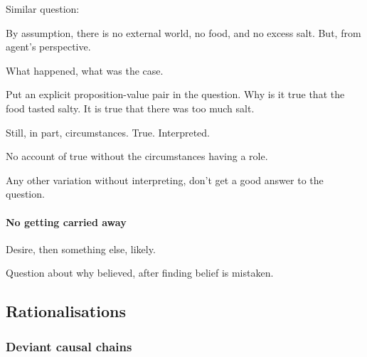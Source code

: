 \nocite{Smith:1988aa,Smith:1987tz}

\begin{note}
  Similar question:

  By assumption, there is no external world, no food, and no excess salt.
  But, from agent's perspective.

  What happened, what was the case.
\end{note}

\begin{note}
  Put an explicit proposition-value pair in the question.
  Why is it true that the food tasted salty.
  It is true that there was too much salt.

  Still, in part, circumstances.
  True.
  Interpreted.

  No account of true without the circumstances having a role.
\end{note}

\begin{note}
  Any other variation without interpreting, don't get a good answer to the question.
\end{note}

\paragraph{No getting carried away}

\begin{note}
  Desire, then something else, likely.
\end{note}

\begin{note}
  Question about why believed, after finding belief is mistaken.
\end{note}

\subsection{Rationalisations}
\label{sec:rationalisations}


\subsubsection{Deviant causal chains}
\label{sec:devi-caus-chains}


